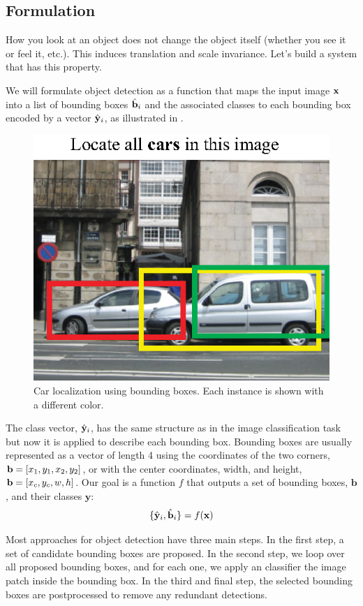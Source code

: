 
\subsection{Formulation}

How you look at an object does not change the object itself (whether you see it or feel it, etc.). This induces translation and scale invariance. Let's build a system that has this property. 

We will formulate object detection as a function that maps the input image ${\bf x}$ into a list of bounding boxes $\hat {\bf b}_i$ and the associated classes to each bounding box encoded by a vector $\hat {\bf y}_i$, as illustrated in \fig{\ref{fig:object_detection_bb}}.
\begin{figure}[h]
\centerline{
\includegraphics[width=0.4\linewidth]{figures/object_recognition/object_detection_bb.eps}
}
\caption{Car localization using bounding boxes. Each instance is shown with a different color.}
\label{fig:object_detection_bb}
\end{figure}


The class vector, $\hat {\bf y}_i$, has the same structure as in the image classification task but now it is applied to describe each bounding box. Bounding boxes are usually represented as a vector of length 4 using the coordinates of the two corners, ${\bf b} = \left[ x_1, y_1, x_2, y_2 \right]$, or with the center coordinates, width, and height, ${\bf b} = \left[ x_c, y_c, w, h \right]$. 
Our goal is a function $f$ that outputs a set of bounding boxes, $\mathbf{b}$, and their classes $\mathbf{y}$:
\begin{equation}
\{\hat {\bf y}_i, \hat {\bf b}_i\} = f({\bf x})
\end{equation}

Most approaches for object detection have three main steps. In the first step, a set of candidate bounding boxes are proposed. In the second step, we loop over all proposed bounding boxes, and for each one, we apply an classifier the image patch inside the bounding box. In the third and final step, the selected bounding boxes are postprocessed to remove any redundant detections. 

